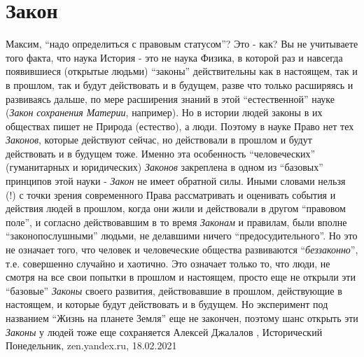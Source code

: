  
 
 
 
 
\chapter{Закон}

Максим, \enquote{надо определиться с правовым статусом}? Это - как? Вы не
учитываете того факта, что наука История - это не наука Физика, в которой раз и
навсегда появившиеся (открытые людьми) \enquote{законы} действительны как в
настоящем, так и в прошлом, так и будут действовать и в будущем, разве что
только расширяясь и развиваясь дальше, по мере расширения знаний в этой
\enquote{естественной} науке (\emph{Закон сохранения Материи}, например). Но в
истории людей законы в их обществах пишет не Природа (естество), а люди.
Поэтому в науке Право нет тех \emph{Законов}, которые действуют сейчас, но действовали
в прошлом и будут действовать и в будущем тоже. Именно эта особенность
\enquote{человеческих} (гуманитарных и юридических) \emph{Законов} закреплена в
одном из \enquote{базовых} принципов этой науки - \emph{Закон} не имеет обратной силы.
Иными словами нельзя (!) с точки зрения современного Права рассматривать и
оценивать события и действия людей в прошлом, когда они жили и действовали в
другом \enquote{правовом поле}, и согласно действовавшим в то время \emph{Законам} и
правилам, были вполне \enquote{законопослушными} людьми, не делавшими ничего
\enquote{предосудительного}.  Но это не означает того, что человек и
человеческие общества развиваются \enquote{\emph{беззаконно}}, т.е. совершенно
случайно и хаотично. Это означает только то, что люди, не смотря на все свои
попытки в прошлом и настоящем, просто еще не открыли эти \enquote{базовые}
\emph{Законы} своего развития, действовавшие в прошлом, действующие в
настоящем, и которые будут действовать и в будущем. Но эксперимент под
названием \enquote{Жизнь на планете Земля} еще не закончен, поэтому шанс
открыть эти \emph{Законы} у людей тоже еще сохраняется
Алексей Джалалов
, 
Исторический Понедельник, zen.yandex.ru, 18.02.2021
